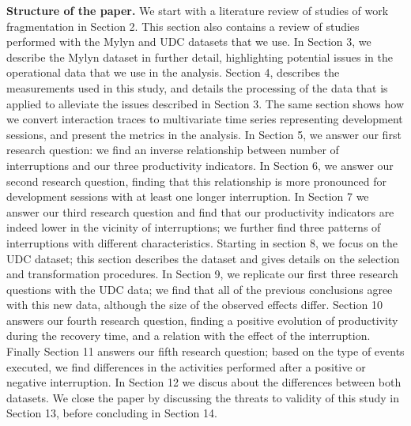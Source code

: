 \documentclass[times]{smrauth}
\begin{document}
\textbf{Structure of the paper.} We start with a literature review of studies of work fragmentation in Section 2. This section also contains a review of studies performed with the Mylyn and UDC datasets that we use. In Section 3, we describe the Mylyn dataset in further detail, highlighting potential issues in the operational data that we use in the analysis. Section 4, describes the measurements used in this study, and details the processing of the data that is applied to alleviate the issues described in Section 3. The same section shows how we convert interaction traces to multivariate time series representing development sessions, and present the metrics in the analysis. In Section 5, we answer our first research question: we find an inverse relationship between number of interruptions and our three productivity indicators. In Section 6, we answer our second research question, finding that this relationship is more pronounced for development sessions with at least one longer interruption. In Section 7 we answer our third research question and find that our productivity indicators are indeed lower in the vicinity of interruptions; we further find three patterns of interruptions with different characteristics. Starting in section 8, we focus on the UDC dataset; this section describes the dataset and gives details on the selection and transformation procedures. In Section 9, we replicate our first three research questions with the UDC data; we find that all of the previous conclusions agree with this new data, although the size of the observed effects differ. Section 10 answers our fourth research question, finding a positive evolution of productivity during the recovery time, and a relation with the effect of the interruption. Finally Section 11 answers our fifth research question; based on the type of events executed, we find differences in the activities performed after a positive or negative interruption. In Section 12 we discus about the differences between both datasets. We close the paper by discussing the threats to validity of this study in Section 13, before concluding in Section 14.

\end{document}
